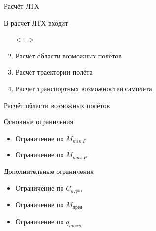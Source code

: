 \begin{frame}{Расчёт ЛТХ}
\begin{block}{В расчёт ЛТХ входит}
   \begin{enumerate}
    \item [] <+->
    \item <+-> Расчёт области возможных полётов
    \item <+-> Расчёт траектории полёта 
    \item <+-> Расчёт транспортных возможностей самолёта
   \end{enumerate}
\end{block}
\end{frame}

\begin{frame}{Расчёт области возможных полётов}

    \begin{block}{Основные ограничения}
        \begin{itemize}
            \item Ограничение по $M_{min \ P}$ 
            \item Ограничение по $M_{max \ P}$
        \end{itemize}
    \end{block}

    \begin{block}{Дополнительные ограничения}
        \begin{itemize}
            \item Ограничение по $C_{y \ \text{доп}}$
            \item Ограничение по $M_\text{пред}$
            \item Ограничение по $q_{maxs}$
        \end{itemize}
    \end{block}

\end{frame}


